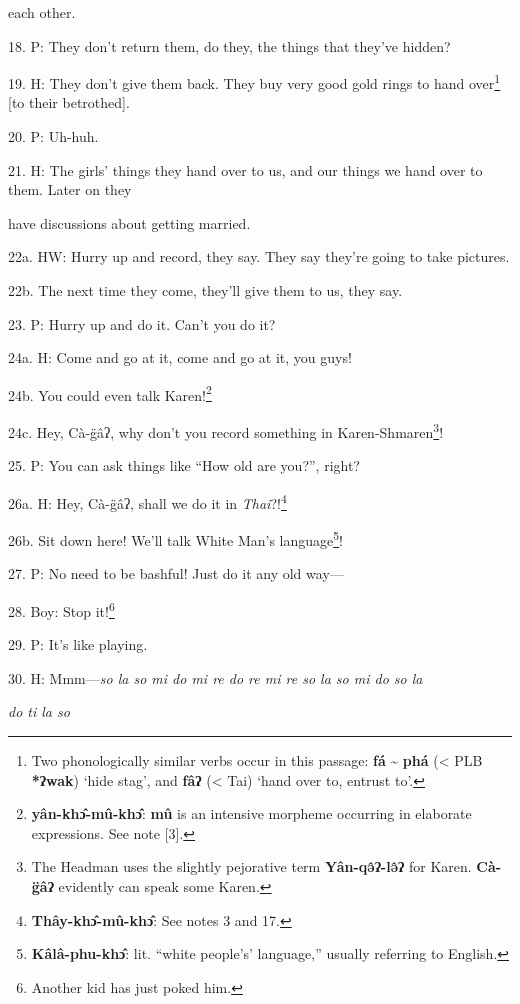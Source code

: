 each other.

18. P: They don't return them, do they, the things that they've hidden?

19. H: They don't give them back. They buy very good gold rings to hand over\footnote{Two phonologically similar verbs occur in this passage: \textbf{fá} \textasciitilde{} \textbf{phá} (< PLB \textbf{*ʔwak}) `hide stag', and \textbf{fâʔ} (< Tai) `hand over to, entrust to'.}
[to their betrothed].

20. P: Uh-huh.

21. H: The girls' things they hand over to us, and our things we hand over to them.
Later on they

have discussions about getting married.

22a. HW: Hurry up and record, they say. They say they're going to take pictures.

22b. The next time they come, they'll give them to us, they say.

23. P: Hurry up and do it. Can't you do it?

24a. H: Come and go at it, come and go at it, you guys!

24b. You could even talk Karen!\footnote{\textbf{yân-khɔ̂-mû-khɔ̂}: \textbf{mû} is an intensive morpheme occurring in elaborate expressions. See note [3].}

24c. Hey, Cà-g̈âʔ, why don't you record something in Karen-Shmaren\footnote{The Headman uses the slightly pejorative term \textbf{Yân-qə̂ʔ-lə̂ʔ} for Karen. \textbf{Cà-g̈âʔ} evidently can speak some Karen.}!

25. P: You can ask things like ``How old are you?'', right?

26a. H: Hey, Cà-g̈âʔ, shall we do it in \textit{Thai}?!\footnote{\textbf{Thây-khɔ̂-mû-khɔ̂}: See notes 3 and 17.}

26b. Sit down here! We'll talk White Man's language\footnote{\textbf{Kâlâ-phu-khɔ̂}: lit. ``white people's' language,'' usually referring to English.}!


27. P: No need to be bashful! Just do it any old way---

28. Boy: Stop it!\footnote{Another kid has just poked him.}

29. P: It's like playing.

30. H:  Mmm---\textit{so la so mi do mi re do re mi re
so la so mi do so la }

\textit{do ti la so} \textit{\textbf{
}}

